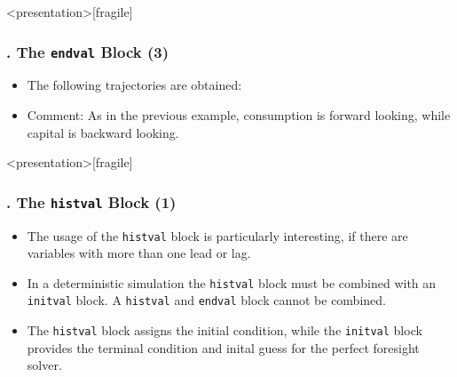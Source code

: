\documentclass[11pt,aspectratio=169]{beamer}
\begin{document}
\begin{frame}<presentation>[fragile]
	\frametitle{{\thesection.\thesubsection\thinspace\thesubsubsection} The \texttt{endval} Block (3)}
		\begin{itemize}
		\item The following trajectories are obtained:
		\begin{figure}
			\centering
			\qquad
			\qquad
		\end{figure}
		\item Comment: As in the previous example, consumption is forward looking, while capital is backward looking.
	\end{itemize}
\end{frame}
\begin{frame}<presentation>[fragile]
	\frametitle{{\thesection.\thesubsection\thinspace\thesubsubsection} The \texttt{histval} Block (1)}
	\begin{itemize}
		\item The usage of the \texttt{histval} block is particularly interesting, if there are variables with more than one lead or lag. 
		\item In a deterministic simulation the \texttt{histval} block must be combined with an \texttt{initval} block. A \texttt{histval} and \texttt{endval} block cannot be combined.
		\item The \texttt{histval} block assigns the initial condition, while the \texttt{initval} block provides the terminal condition and inital guess for the perfect foresight solver.
	\end{itemize}
\end{frame}
\end{document}

